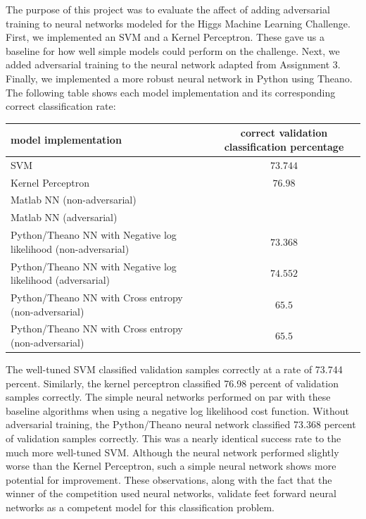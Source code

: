 \documentclass{article} %
\begin{document}
The purpose of this project was to evaluate the affect of adding adversarial training to neural networks modeled for the Higgs Machine Learning Challenge. First, we implemented an SVM and a Kernel Perceptron. These gave us a baseline for how well simple models could perform on the challenge. Next, we added adversarial training to the neural network adapted from Assignment 3. Finally, we implemented a more robust neural network in Python using Theano. The following table shows each model implementation and its corresponding correct classification rate:

\begin{center}
	\begin{tabular}{|l|c|}
	  \hline
	  model implementation&correct validation classification percentage \\
		\hline
		SVM&$73.744$ \\
		\hline
		Kernel Perceptron&$76.98$ \\
		\hline
		Matlab NN (non-adversarial)&  \\
		\hline
		Matlab NN (adversarial)&  \\
	  \hline
	  Python/Theano NN with Negative log likelihood (non-adversarial)&$73.368$ \\
		\hline
		Python/Theano NN with Negative log likelihood (adversarial)&$74.552$ \\
	  \hline
	  Python/Theano NN with Cross entropy (non-adversarial)&$65.5$ \\
		\hline
	  Python/Theano NN with Cross entropy (non-adversarial)&$65.5$ \\
	  \hline
	\end{tabular}
\end{center}
 
The well-tuned SVM classified validation samples correctly at a rate of 73.744 percent. Similarly, the kernel perceptron classified 76.98 percent of validation samples correctly. The simple neural networks performed on par with these baseline algorithms when using a negative log likelihood cost function. Without adversarial training, the Python/Theano neural network classified 73.368 percent of validation samples correctly. This was a nearly identical success rate to the much more well-tuned SVM. Although the neural network performed slightly worse than the Kernel Perceptron, such a simple neural network shows more potential for improvement. These observations, along with the fact that the winner of the competition used neural networks, validate feet forward neural networks as a competent model for this classification problem.
\end{document}
